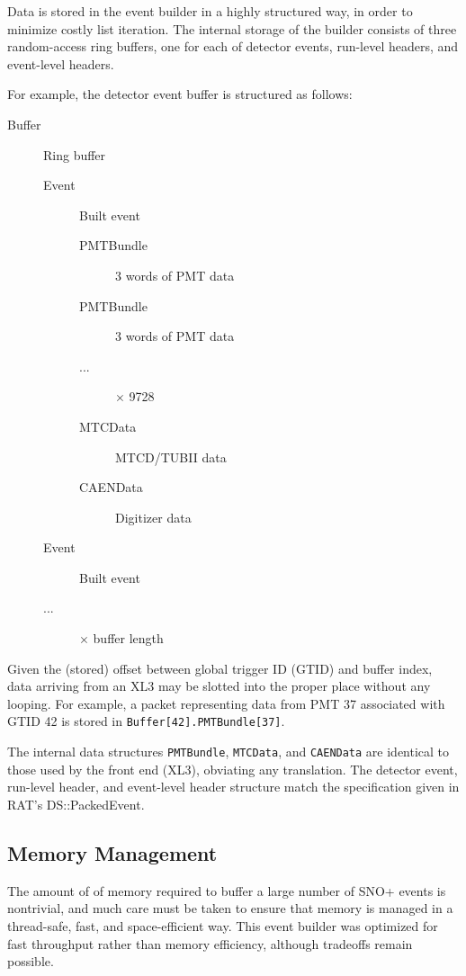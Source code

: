 \documentclass[11pt,twocolumn]{article}
\begin{document}
Data is stored in the event builder in a highly structured way, in order to minimize costly list iteration. The internal storage of the builder consists of three random-access ring buffers, one for each of detector events, run-level headers, and event-level headers.

For example, the detector event buffer is structured as follows:
\begin{description}
\item[Buffer] Ring buffer
\begin{description}
\item[Event] Built event
\begin{description}
\item[PMTBundle] 3 words of PMT data
\item[PMTBundle] 3 words of PMT data
\item[ ...] $\times$ 9728 
\item[MTCData] MTCD/TUBII data
\item[CAENData] Digitizer data
\end{description}
\item[Event] Built event
\item[...] $\times$ buffer length
\end{description}
\end{description}
Given the (stored) offset between global trigger ID (GTID) and buffer index, data arriving from an XL3 may be slotted into the proper place without any looping. For example, a packet representing data from PMT 37 associated with GTID 42 is stored in {\tt Buffer[42].PMTBundle[37]}.

The internal data structures {\tt PMTBundle}, {\tt MTCData}, and {\tt CAENData} are identical to those used by the front end (XL3), obviating any translation. The detector event, run-level header, and event-level header structure match the specification given in RAT's DS::PackedEvent.

\subsection{Memory Management}
The amount of of memory required to buffer a large number of SNO+ events is nontrivial, and much care must be taken to ensure that memory is managed in a thread-safe, fast, and space-efficient way. This event builder was optimized for fast throughput rather than memory efficiency, although tradeoffs remain possible.
\end{document}
